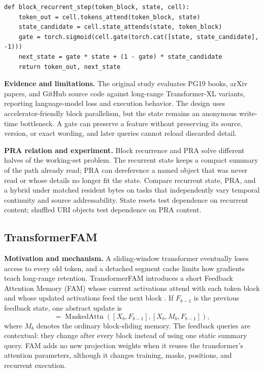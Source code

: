 \begin{lstlisting}[caption={Simplified block-recurrent update}]
def block_recurrent_step(token_block, state, cell):
    token_out = cell.tokens_attend(token_block, state)
    state_candidate = cell.state_attends(state, token_block)
    gate = torch.sigmoid(cell.gate(torch.cat([state, state_candidate], -1)))
    next_state = gate * state + (1 - gate) * state_candidate
    return token_out, next_state
\end{lstlisting}

\textbf{Evidence and limitations.} The original study evaluates PG19 books, arXiv papers,
and GitHub source code against long-range Transformer-XL variants, reporting language-model
loss and execution behavior. The design uses accelerator-friendly block parallelism, but
the state remains an anonymous write-time bottleneck. A gate can preserve a feature without
preserving its source, version, or exact wording, and later queries cannot reload discarded
detail.

\textbf{PRA relation and experiment.} Block recurrence and PRA solve different halves of
the working-set problem. The recurrent state keeps a compact summary of the path already
read; PRA can dereference a named object that was never read or whose details no longer fit
the state. Compare recurrent state, PRA, and a hybrid under matched resident bytes on tasks
that independently vary temporal continuity and source addressability. State resets test
dependence on recurrent content; shuffled URI objects test dependence on PRA content.

\subsection{TransformerFAM}

\textbf{Motivation and mechanism.} A sliding-window transformer eventually loses access
to every old token, and a detached segment cache limits how gradients teach long-range
retention. TransformerFAM introduces a short Feedback Attention Memory (FAM) whose current
activations attend with each token block and whose updated activations feed the next block
\citep{hwang2024transformerfam}. If $F_{b-1}$ is the previous feedback state, one abstract
update is
\begin{equation}
[H_b,F_b]=\operatorname{MaskedAttn}([X_b,F_{b-1}],
                                    [X_b,M_b,F_{b-1}]),
\end{equation}
where $M_b$ denotes the ordinary block-sliding memory. The feedback queries are contextual:
they change after every block instead of using one static summary query. FAM adds no new
projection weights when it reuses the transformer's attention parameters, although it
changes training, masks, positions, and recurrent execution.

